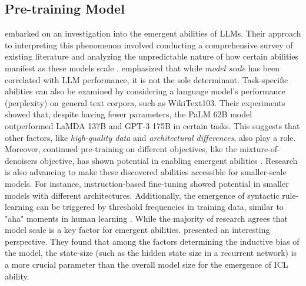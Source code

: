 \subsection{Pre-training Model}
\citet{Wei2022EmergentAO} embarked on an investigation into the emergent abilities of LLMs. 
Their approach to interpreting this phenomenon involved conducting a comprehensive survey of existing literature and analyzing the unpredictable nature of how certain abilities manifest as these models scale \citep{Brown2020LanguageMA}. 
\citet{Wei2022EmergentAO} emphasized that while \textit{model scale} has been correlated with LLM performance, it is not the sole determinant. Task-specific abilities can also be examined by considering a language model’s performance (perplexity) on general text corpora, such as WikiText103. 
Their experiments showed that, despite having fewer parameters, the PaLM 62B model outperformed LaMDA 137B and GPT-3 175B in certain tasks. This suggests that other factors, like \textit{high-quality data} and \textit{architectural differences}, also play a role.
Moreover, continued pre-training on different objectives, like the mixture-of-denoisers objective, has shown potential in enabling emergent abilities \citep{Tay2022UnifyingLL}. 
Research is also advancing to make these discovered abilities accessible for smaller-scale models.
For instance, instruction-based fine-tuning showed potential in smaller models with different architectures. 
Additionally, the emergence of syntactic rule-learning can be triggered by threshold frequencies in training data, similar to "aha" moments in human learning \citep{Abend2017BootstrappingLA, Zhang2020WhenDY}.
 While the majority of research agrees that model scale is a key factor for emergent abilities. 
 \citet{Kirsch2022GeneralPurposeIL} presented an interesting perspective. They found that among the factors determining the inductive bias of the model, the state-size (such as the hidden state size in a recurrent network) is a more crucial parameter than the overall model size for the emergence of ICL ability.






